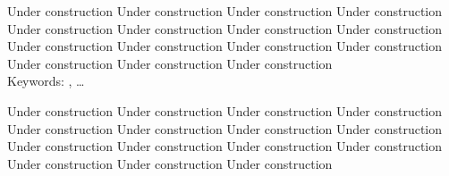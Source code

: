 \documentclass[
11pt, %
english, %
singlespacing, %
headsepline, %
]{MastersDoctoralThesis} %
\begin{document}








%

Under construction Under construction Under construction Under construction Under construction
Under construction Under construction Under construction Under construction Under construction
Under construction Under construction Under construction Under construction Under construction 
\\

Keywords: \keywordnames, \ldots



%

Under construction Under construction Under construction Under construction Under construction
Under construction Under construction Under construction Under construction Under construction
Under construction Under construction Under construction Under construction Under construction 
\\
\end{document}
